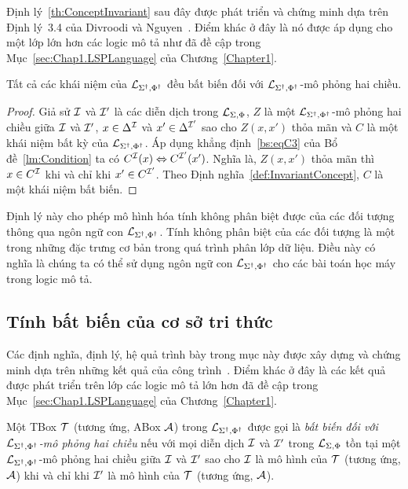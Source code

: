 Định lý~\ref{th:ConceptInvariant} sau đây được phát triển và chứng minh dựa trên Định lý~3.4 của Divroodi và Nguyen~\cite{Divroodi2011B}. Điểm khác ở đây là nó được áp dụng cho một lớp lớn hơn các logic mô tả như đã đề cập trong Mục~\ref{sec:Chap1.LSPLanguage} của Chương~\ref{Chapter1}.

\begin{Theorem}
	\label{th:ConceptInvariant}
	Tất cả các khái niệm của $\mathcal{L}_{\Sigma^\dag,\Phi^\dag}$ đều bất biến đối với $\mathcal{L}_{\Sigma^\dag,\Phi^\dag}$-mô phỏng hai chiều.
\end{Theorem}

\begin{proof}
	Giả sử $\mathcal{I}$ và $\mathcal{I}'$ là các diễn dịch trong $\mathcal{L}_{\Sigma,\Phi}$, $Z$ là một $\mathcal{L}_{\Sigma^\dag,\Phi^\dag}$-mô phỏng hai chiều giữa $\mathcal{I}$ và $\mathcal{I}'$, $x \in \Delta^{\mathcal{I}}$ và $x' \in \Delta^{\mathcal{I}'}$ sao cho $Z(x, x')$ thỏa mãn và $C$ là một khái niệm bất kỳ của $\mathcal{L}_{\Sigma^\dag,\Phi^\dag}$. Áp dụng khẳng định~\eqref{bs:eqC3} của Bổ đề~\ref{lm:Condition} ta có $C^{\mathcal{I}}(x) \Leftrightarrow C^{\mathcal{I}'}(x')$. Nghĩa là, $Z(x,x')$ thỏa mãn thì $x \in C^{\mathcal{I}}$ khi và chỉ khi $x' \in C^{\mathcal{I}'}$. Theo Định nghĩa~\ref{def:InvariantConcept}, $C$ là một khái niệm bất biến.
\end{proof}

Định lý này cho phép mô hình hóa tính không phân biệt được của các đối tượng thông qua ngôn ngữ con $\mathcal{L}_{\Sigma^\dag,\Phi^\dag}$. Tính không phân biệt của các đối tượng là một trong những đặc trưng cơ bản trong quá trình phân lớp dữ liệu. Điều này có nghĩa là chúng ta có thể sử dụng ngôn ngữ con $\mathcal{L}_{\Sigma^\dag,\Phi^\dag}$ cho các bài toán học máy trong logic mô tả.

\subsection{Tính bất biến của cơ sở tri thức}
\label{sec:Chap2.KnowlwdgeBaseInvariant}

Các định nghĩa, định lý, hệ quả trình bày trong mục này được xây dựng và chứng minh dựa trên những kết quả của công trình~\cite{Divroodi2011B}. Điểm khác ở đây là các kết quả được phát triển trên lớp các logic mô tả lớn hơn đã đề cập trong Mục~\ref{sec:Chap1.LSPLanguage} của Chương~\ref{Chapter1}.

\begin{Definition}
\label{def:BoxInvariant}
	Một TBox $\mathcal{T}$ (tương ứng, ABox $\mathcal{A}$) trong $\mathcal{L}_{\Sigma^\dag,\Phi^\dag}$ được gọi là {\em bất biến đối với $\mathcal{L}_{\Sigma^\dag,\Phi^\dag}$-mô phỏng hai chiều} nếu với mọi diễn dịch $\mathcal{I}$ và $\mathcal{I}'$ trong $\mathcal{L}_{\Sigma,\Phi}$ tồn tại một $\mathcal{L}_{\Sigma^\dag,\Phi^\dag}$-mô phỏng hai chiều giữa $\mathcal{I}$ và $\mathcal{I}'$ sao cho $\mathcal{I}$ là mô hình của $\mathcal{T}$ (tương ứng, $\mathcal{A}$) khi và chỉ khi $\mathcal{I}'$ là mô hình của $\mathcal{T}$ (tương ứng, $\mathcal{A}$).\myend
\end{Definition}

